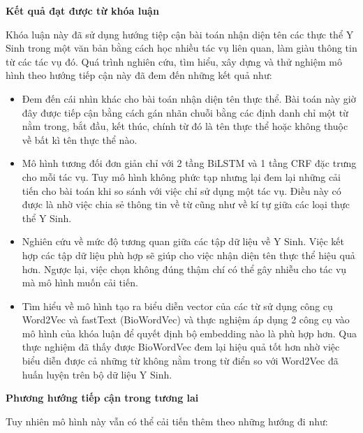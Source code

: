 \documentclass[../main.tex]{subfiles}
\begin{document}
\textbf{Kết quả đạt được từ khóa luận}

Khóa luận này đã sử dụng hướng tiệp cận bài toán nhận diện tên các thực thể Y Sinh trong một văn bản bằng cách học nhiều tác vụ liên quan, làm giàu thông tin từ các tác vụ đó. Quá trình nghiên cứu, tìm hiểu, xây dựng và thử nghiệm mô hình theo hướng tiếp cận này đã đem đến những kết quả như: 
\begin{itemize}

\item Đem đến cái nhìn khác cho bài toán nhận diện tên thực thể. Bài toán này giờ đây được tiếp cận bằng cách gán nhãn chuỗi bằng các định danh chỉ một từ nằm trong, bắt đầu, kết thúc, chính từ đó là tên thực thể hoặc không thuộc về bất kì tên thực thể nào. 

\item Mô hình tương đối đơn giản chỉ với 2 tầng BiLSTM và 1 tầng CRF đặc trưng cho mỗi tác vụ. Tuy mô hình không phức tạp nhưng lại đem lại những cải tiến cho bài toán khi so sánh với việc chỉ sử dụng một tác vụ. Điều này có được là nhờ việc chia sẻ thông tin về từ cũng như về kí tự giữa các loại thực thể Y Sinh. 

\item Nghiên cứu về mức độ tương quan giữa các tập dữ liệu về Y Sinh. Việc kết hợp các tập dữ liệu phù hợp sẽ giúp cho việc nhận diện tên thực thể hiệu quả hơn. Ngược lại, việc chọn không đúng thậm chí có thể gây nhiễu cho tác vụ mà mô hình muốn cải tiến.

\item Tìm hiểu về mô hình tạo ra biểu diễn vector của các từ sử dụng công cụ Word2Vec và fastText (BioWordVec) và thực nghiệm áp dụng 2 công cụ vào mô hình của khóa luận để quyết định bộ embedding nào là phù hợp hơn. Qua thực nghiệm đã thấy được BioWordVec đem lại hiệu quả tốt hơn nhờ việc biểu diễn được cả những từ không nằm trong từ điển so với Word2Vec đã huấn luyện trên bộ dữ liệu Y Sinh. 


\end{itemize}


\textbf{Phương hướng tiếp cận trong tương lai}

Tuy nhiên mô hình này vẫn có thể cải tiến thêm theo những hướng đi như: 
\end{document}
